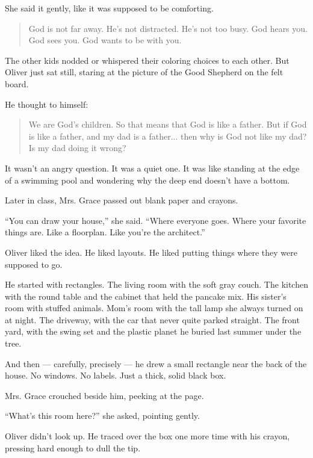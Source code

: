 She said it gently, like it was supposed to be comforting.

\begin{quote}
God is not far away. He’s not distracted. He’s not too busy. God hears you. God sees you. God wants to 
be with you.
\end{quote}

The other kids nodded or whispered their coloring choices to each other. But Oliver just sat still, 
staring at the picture of the Good Shepherd on the felt board.

He thought to himself: 
\medskip

\begin{quote}
We are God's children. So that means that God is like a father. But if God is like a father, 
and my dad is a father...  then why is God not like my dad? Is my dad doing it wrong?
\end{quote}

\medskip

It wasn’t an angry question. It was a quiet one. It was like standing at the edge of a swimming pool and 
wondering why the deep end doesn’t have a bottom.

Later in class, Mrs. Grace passed out blank paper and crayons.

``You can draw your house,'' she said. ``Where everyone 
goes. Where your favorite things are. Like a floorplan. Like you're the architect.''

Oliver liked the idea. He liked layouts. He liked putting things where they were supposed to go.

He started with rectangles.  
The living room with the soft gray couch.  
The kitchen with the round table and the cabinet that held the pancake mix.  
His sister’s room with stuffed animals.  
Mom’s room with the tall lamp she always turned on at night.  
The driveway, with the car that never quite parked straight.  
The front yard, with the swing set and the plastic planet he buried last summer under the tree.

And then — carefully, precisely — he drew a small rectangle near the back of the house. No windows. 
No labels. Just a thick, solid black box.

Mrs. Grace crouched beside him, peeking at the page.

``What’s this room here?'' she asked, pointing gently.

Oliver didn’t look up. He traced over the box one more time with his crayon, pressing hard enough to 
dull the tip.

